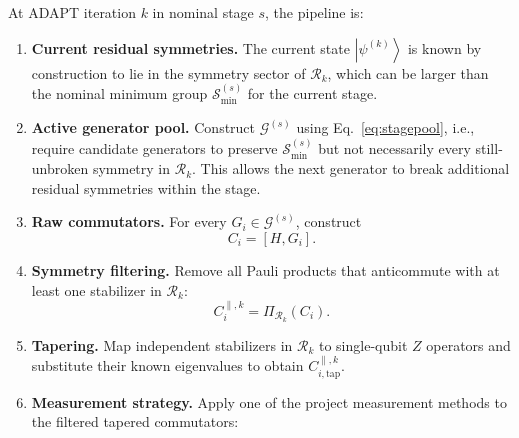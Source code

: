 \documentclass[11pt]{article}
\newcommand{\ket}[1]{\left|#1\right\rangle}
\newcommand{\stagepool}{\mathcal G^{(s)}}
\newcommand{\minsym}{\mathcal S_{\min}^{(s)}}
\newcommand{\resgrp}{\mathcal R_k}
\begin{document}
At ADAPT iteration $k$ in nominal stage $s$, the pipeline is:
\begin{enumerate}[label=\textbf{Step \arabic*.},leftmargin=2.4em]
    \item \textbf{Current residual symmetries.} The current state $\ket{\psi^{(k)}}$ is known by construction to lie in the symmetry sector of $\resgrp$, which can be larger than the nominal minimum group $\minsym$ for the current stage.
    \item \textbf{Active generator pool.} Construct $\stagepool$ using Eq.~\eqref{eq:stagepool}, i.e., require candidate generators to preserve $\minsym$ but not necessarily every still-unbroken symmetry in $\resgrp$. This allows the next generator to break additional residual symmetries within the stage.
    \item \textbf{Raw commutators.} For every $G_i\in\stagepool$, construct
    \begin{equation}
        C_i=[H,G_i].
    \end{equation}
    \item \textbf{Symmetry filtering.} Remove all Pauli products that anticommute with at least one stabilizer in $\resgrp$:
    \begin{equation}
        C_i^{\parallel,k}=\Pi_{\resgrp}(C_i).
    \end{equation}
    \item \textbf{Tapering.} Map independent stabilizers in $\resgrp$ to single-qubit $Z$ operators and substitute their known eigenvalues to obtain $C_{i,\mathrm{tap}}^{\parallel,k}$.
    \item \textbf{Measurement strategy.} Apply one of the project measurement methods to the filtered tapered commutators:
\end{enumerate}
\end{document}
